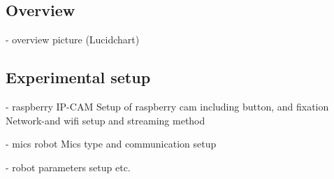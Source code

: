 \subsection{Overview}

- overview picture (Lucidchart) 

\subsection{Experimental setup}

- raspberry IP-CAM
Setup of raspberry cam including button, and fixation
Network-and wifi setup and streaming method

- mics robot
Mics type and communication setup

- robot parameters setup etc. 

